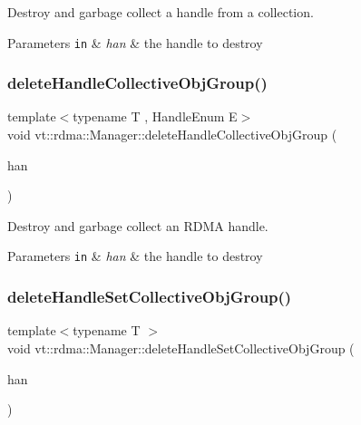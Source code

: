 Destroy and garbage collect a handle from a collection. 


\begin{DoxyParams}[1]{Parameters}
\mbox{\tt in}  & {\em han} & the handle to destroy \\
\hline
\end{DoxyParams}
\mbox{\label{structvt_1_1rdma_1_1_manager_a4219310feca011fd242e654c9ba51280}} 
\subsubsection{\texorpdfstring{delete\+Handle\+Collective\+Obj\+Group()}{deleteHandleCollectiveObjGroup()}}
{\footnotesize\ttfamily template$<$typename T , Handle\+Enum E$>$ \\
void vt\+::rdma\+::\+Manager\+::delete\+Handle\+Collective\+Obj\+Group (\begin{DoxyParamCaption}\item[{\hyperlink{structvt_1_1rdma_1_1_handle}{Handle}$<$ T, E $>$ const \&}]{han }\end{DoxyParamCaption})}



Destroy and garbage collect an R\+D\+MA handle. 


\begin{DoxyParams}[1]{Parameters}
\mbox{\tt in}  & {\em han} & the handle to destroy \\
\hline
\end{DoxyParams}
\mbox{\label{structvt_1_1rdma_1_1_manager_a9b3b9bf148a8225295879481345e4af3}} 
\subsubsection{\texorpdfstring{delete\+Handle\+Set\+Collective\+Obj\+Group()}{deleteHandleSetCollectiveObjGroup()}}
{\footnotesize\ttfamily template$<$typename T $>$ \\
void vt\+::rdma\+::\+Manager\+::delete\+Handle\+Set\+Collective\+Obj\+Group (\begin{DoxyParamCaption}\item[{\hyperlink{structvt_1_1rdma_1_1_handle_set}{Handle\+Set}$<$ T $>$ \&}]{han }\end{DoxyParamCaption})}



